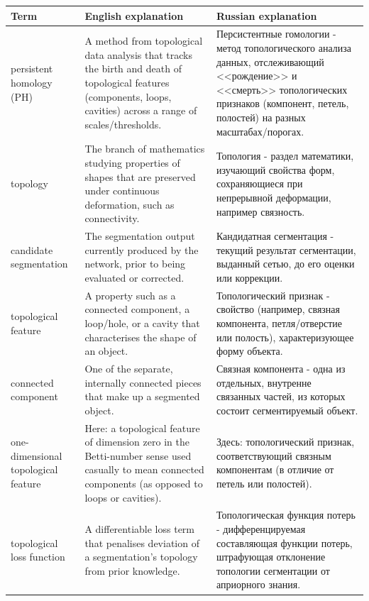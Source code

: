 \documentclass[12pt,a4paper]{article}
\begin{document}
\begin{longtable}{p{3.2cm}p{5.3cm}p{6.8cm}}
\textbf{Term} & \textbf{English explanation} & \textbf{Russian explanation} \\
\hline
\endhead
persistent homology (PH) &
A method from topological data analysis that tracks the birth and
death of topological features (components, loops, cavities) across
a range of scales/thresholds. &
Персистентные гомологии - метод топологического анализа данных,
отслеживающий <<рождение>> и <<смерть>> топологических признаков
(компонент, петель, полостей) на разных масштабах/порогах. \\

topology &
The branch of mathematics studying properties of shapes that are
preserved under continuous deformation, such as connectivity. &
Топология - раздел математики, изучающий свойства форм,
сохраняющиеся при непрерывной деформации, например связность. \\

candidate segmentation &
The segmentation output currently produced by the network, prior to
being evaluated or corrected. &
Кандидатная сегментация - текущий результат сегментации,
выданный сетью, до его оценки или коррекции. \\

topological feature &
A property such as a connected component, a loop/hole, or a cavity
that characterises the shape of an object. &
Топологический признак - свойство (например, связная компонента,
петля/отверстие или полость), характеризующее форму объекта. \\

connected component &
One of the separate, internally connected pieces that make up a
segmented object. &
Связная компонента - одна из отдельных, внутренне связанных
частей, из которых состоит сегментируемый объект. \\

one-dimensional topological feature &
Here: a topological feature of dimension zero in the Betti-number
sense used casually to mean connected components (as opposed to
loops or cavities). &
Здесь: топологический признак, соответствующий связным компонентам
(в отличие от петель или полостей). \\

topological loss function &
A differentiable loss term that penalises deviation of a
segmentation's topology from prior knowledge. &
Топологическая функция потерь - дифференцируемая составляющая
функции потерь, штрафующая отклонение топологии сегментации от
априорного знания. \\


\end{longtable}
\end{document}
